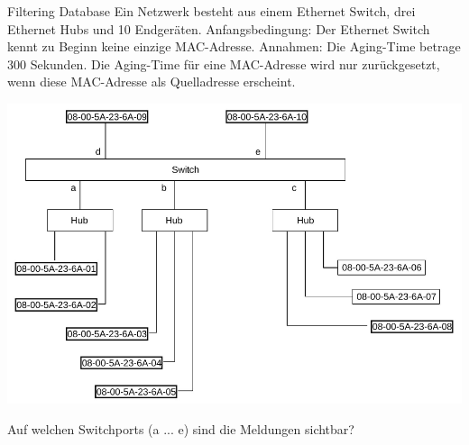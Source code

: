 \begin{example2}{Filtering Database}
  Ein Netzwerk besteht aus einem Ethernet Switch, drei Ethernet Hubs und 10 Endgeräten. Anfangsbedingung: Der Ethernet Switch kennt zu Beginn keine einzige MAC-Adresse. Annahmen: Die Aging-Time betrage 300 Sekunden. Die Aging-Time für eine MAC-Adresse wird nur zurückgesetzt, wenn diese MAC-Adresse als Quelladresse erscheint.

\vspace{1mm}

\includegraphics[width=0.9\linewidth]{images/bsp_filtering_database1.png}

Auf welchen Switchports (a ... e) sind die Meldungen sichtbar?

\vspace{1mm}


\end{example2}
